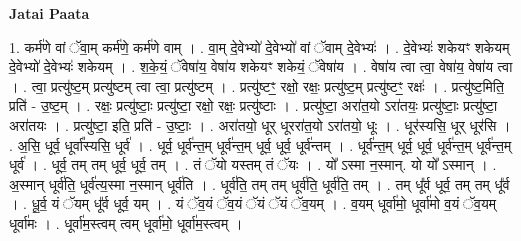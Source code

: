\documentclass[17pt]{extarticle}
\begin{document}
\textbf{Jatai Paata} \newline

1. कर्म॑णे वां ॅवा॒म् कर्म॑णे॒ कर्म॑णे वाम् । . वा॒म् दे॒वेभ्यो॑ दे॒वेभ्यो॑ वां ॅवाम् दे॒वेभ्यः॑ । . दे॒वेभ्यः॑ शकेयꣳ शकेयम् दे॒वेभ्यो॑ दे॒वेभ्यः॑ शकेयम् । . श॒के॒यं॒ ॅवेषा॑य॒ वेषा॑य शकेयꣳ शकेयं॒ ॅवेषा॑य । . वेषा॑य त्वा त्वा॒ वेषा॑य॒ वेषा॑य त्वा । . त्वा॒ प्रत्यु॑ष्ट॒म् प्रत्यु॑ष्टम् त्वा त्वा॒ प्रत्यु॑ष्टम् । . प्रत्यु॑ष्टꣳ॒॒ रक्षो॒ रक्षः॒ प्रत्यु॑ष्ट॒म् प्रत्यु॑ष्टꣳ॒॒ रक्षः॑ । . प्रत्यु॑ष्ट॒मिति॒ प्रति॑ - उ॒ष्ट॒म् । . रक्षः॒ प्रत्यु॑ष्टाः॒ प्रत्यु॑ष्टा॒ रक्षो॒ रक्षः॒ प्रत्यु॑ष्टाः । . प्रत्यु॑ष्टा॒ अरा॑त॒यो ऽरा॑तयः॒ प्रत्यु॑ष्टाः॒ प्रत्यु॑ष्टा॒ अरा॑तयः । . प्रत्यु॑ष्टा॒ इति॒ प्रति॑ - उ॒ष्टाः॒ । . अरा॑तयो॒ धूर् धूररा॑त॒यो ऽरा॑तयो॒ धूः । . धूर॑स्यसि॒ धूर् धूर॑सि । . अ॒सि॒ धूर्व॒ धूर्वा᳚स्यसि॒ धूर्व॑ । . धूर्व॒ धूर्व॑न्त॒म् धूर्व॑न्त॒म् धूर्व॒ धूर्व॒ धूर्व॑न्तम् । . धूर्व॑न्त॒म् धूर्व॒ धूर्व॒ धूर्व॑न्त॒म् धूर्व॑न्त॒म् धूर्व॑ । . धूर्व॒ तम् तम् धूर्व॒ धूर्व॒ तम् । . तं ॅयो यस्तम् तं ॅयः । . यो᳚ ऽस्मा न॒स्मान्. यो यो᳚ ऽस्मान् । . अ॒स्मान् धूर्व॑ति॒ धूर्व॑त्य॒स्मा न॒स्मान् धूर्व॑ति । . धूर्व॑ति॒ तम् तम् धूर्व॑ति॒ धूर्व॑ति॒ तम् । . तम् धू᳚र्व धूर्व॒ तम् तम् धू᳚र्व । . धू॒र्व॒ यं ॅयम् धू᳚र्व धूर्व॒ यम् । . यं ॅव॒यं ॅव॒यं ॅयं ॅयं ॅव॒यम् । . व॒यम् धूर्वा॑मो॒ धूर्वा॑मो व॒यं ॅव॒यम् धूर्वा॑मः । . धूर्वा॑म॒स्त्वम् त्वम् धूर्वा॑मो॒ धूर्वा॑म॒स्त्वम् । \newline
\end{document}
